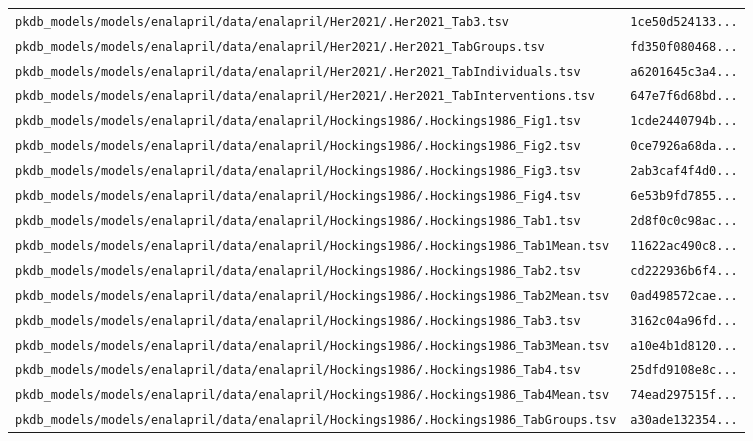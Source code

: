 \begin{longtable}{ll}
\texttt{pkdb\_models/models/enalapril/data/enalapril/Her2021/.Her2021\_Tab3.tsv} & \texttt{1ce50d524133...} \\
\texttt{pkdb\_models/models/enalapril/data/enalapril/Her2021/.Her2021\_TabGroups.tsv} & \texttt{fd350f080468...} \\
\texttt{pkdb\_models/models/enalapril/data/enalapril/Her2021/.Her2021\_TabIndividuals.tsv} & \texttt{a6201645c3a4...} \\
\texttt{pkdb\_models/models/enalapril/data/enalapril/Her2021/.Her2021\_TabInterventions.tsv} & \texttt{647e7f6d68bd...} \\
\texttt{pkdb\_models/models/enalapril/data/enalapril/Hockings1986/.Hockings1986\_Fig1.tsv} & \texttt{1cde2440794b...} \\
\texttt{pkdb\_models/models/enalapril/data/enalapril/Hockings1986/.Hockings1986\_Fig2.tsv} & \texttt{0ce7926a68da...} \\
\texttt{pkdb\_models/models/enalapril/data/enalapril/Hockings1986/.Hockings1986\_Fig3.tsv} & \texttt{2ab3caf4f4d0...} \\
\texttt{pkdb\_models/models/enalapril/data/enalapril/Hockings1986/.Hockings1986\_Fig4.tsv} & \texttt{6e53b9fd7855...} \\
\texttt{pkdb\_models/models/enalapril/data/enalapril/Hockings1986/.Hockings1986\_Tab1.tsv} & \texttt{2d8f0c0c98ac...} \\
\texttt{pkdb\_models/models/enalapril/data/enalapril/Hockings1986/.Hockings1986\_Tab1Mean.tsv} & \texttt{11622ac490c8...} \\
\texttt{pkdb\_models/models/enalapril/data/enalapril/Hockings1986/.Hockings1986\_Tab2.tsv} & \texttt{cd222936b6f4...} \\
\texttt{pkdb\_models/models/enalapril/data/enalapril/Hockings1986/.Hockings1986\_Tab2Mean.tsv} & \texttt{0ad498572cae...} \\
\texttt{pkdb\_models/models/enalapril/data/enalapril/Hockings1986/.Hockings1986\_Tab3.tsv} & \texttt{3162c04a96fd...} \\
\texttt{pkdb\_models/models/enalapril/data/enalapril/Hockings1986/.Hockings1986\_Tab3Mean.tsv} & \texttt{a10e4b1d8120...} \\
\texttt{pkdb\_models/models/enalapril/data/enalapril/Hockings1986/.Hockings1986\_Tab4.tsv} & \texttt{25dfd9108e8c...} \\
\texttt{pkdb\_models/models/enalapril/data/enalapril/Hockings1986/.Hockings1986\_Tab4Mean.tsv} & \texttt{74ead297515f...} \\
\texttt{pkdb\_models/models/enalapril/data/enalapril/Hockings1986/.Hockings1986\_TabGroups.tsv} & \texttt{a30ade132354...} \\

\end{longtable}
